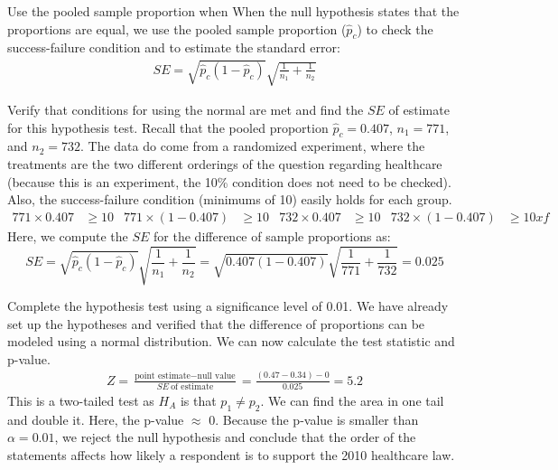 \begin{onebox}{Use the pooled sample proportion when }
When the null hypothesis states that the proportions are equal, we use the pooled sample proportion ($\hat{p}_c$) to check the success-failure condition and to estimate the standard error:
\begin{eqnarray*}
SE =\sqrt{\hat{p}_c(1-\hat{p}_c)}\sqrt{\frac{1}{n_1} + \frac{1}{n_2}}
\label{seOfDiffInPropUsingPooledEstimate}
\end{eqnarray*}
\end{onebox}



\begin{examplewrap}
\begin{nexample}{Verify that conditions for using the normal are met and find the $SE$ of estimate for this hypothesis test.  Recall that the pooled proportion $\hat{p}_c=0.407$, $n_1 = 771$, and $n_2=732$.}
The data do come from a randomized experiment, where the treatments are the two different orderings of the question regarding healthcare (because this is an experiment, the 10\% condition does not need to be checked).  Also, the success-failure condition (minimums of 10) easily holds for each group.
\begin{align*}
771 \times 0.407 &\ge 10
	&771 \times (1-0.407) &\ge 10
	&732 \times 0.407 &\ge 10
	&732 \times (1-0.407) &\ge 10xf
\end{align*}
Here, we compute the $SE$ for the difference of sample proportions as:
$$SE =\sqrt{\hat{p}_c(1-\hat{p}_c)}\sqrt{\frac{1}{n_1} + \frac{1}{n_2}}=\sqrt{0.407(1-0.407)}\sqrt{\frac{1}{771} + \frac{1}{732}}=0.025$$
\end{nexample}
\end{examplewrap}



\begin{examplewrap}
\begin{nexample}{Complete the hypothesis test using a significance level of 0.01.}
We have already set up the hypotheses and verified that the difference of proportions can be modeled using a normal distribution.  We can now calculate the test statistic and p-value.  
\begin{eqnarray*}
Z = \frac{\text{point estimate} - \text{null value}}{SE\ \text{of estimate}}= \frac{(0.47-0.34) - 0}{0.025} = 5.2
\end{eqnarray*}
This is a two-tailed test as $H_A$ is that $p_1\ne p_2$.  We can find the area in one tail and double it.  Here, the p-value $\approx$ 0.  Because the p-value is smaller than $\alpha = 0.01$, we reject the null hypothesis and conclude that the order of the statements affects how likely a respondent is to support the 2010 healthcare law.
\end{nexample}
\end{examplewrap}
 
